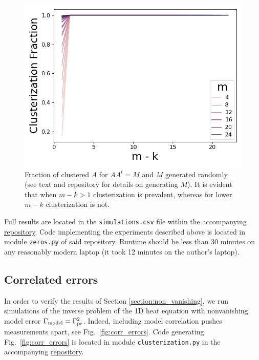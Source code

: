 \begin{figure}
    \centering
    \includegraphics[height=0.5\textwidth]{figs/simulations.png}
    \caption{Fraction of clustered $A$ for $AA^t = M$ and $M$
      generated randomly (see text and repository for details on
      generating $M$). It is evident that when $m-k > 1$ clusterization
      is prevalent, whereas for lower $m-k$ clusterization is not.}
  \label{fig:sim_AAt}
\end{figure}

Full results are located in the \texttt{simulations.csv} file within
the accompanying \href{https://github.com/yairdaon/OED}{repository}.
Code implementing the experiments described above is located in module
\texttt{zeros.py} of said repository. Runtime should be less than 30
minutes on any reasonably modern laptop (it took 12 minutes on the
author's laptop).





\subsection{Correlated errors}\label{subsec:corr_errors_sims}
In order to verify the results of Section \ref{section:non_vanishing},
we run simulations of the inverse problem of the 1D heat equation with
nonvanishing model error \(\Gamma_{\textup{model}} = \Gamma_{\textup{pr}}^2 \). Indeed, including
model correlation pushes measurements apart, see
Fig.~\ref{fig:corr_errors}. Code generating Fig.~\ref{fig:corr_errors}
is located in module \texttt{clusterization.py} in the accompanying
\href{https://github.com/yairdaon/OED}{repository}.

